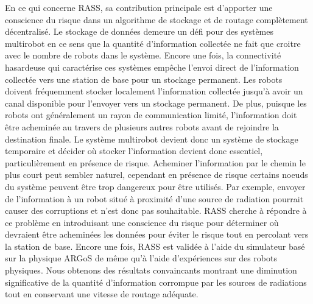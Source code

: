 En ce qui concerne RASS, sa contribution principale est d'apporter une conscience du risque dans un algorithme de stockage et de routage complètement décentralisé. Le stockage de données demeure un défi pour des systèmes multirobot en ce sens que la quantité d'information collectée ne fait que croitre avec le nombre de robots dans le système. Encore une fois, la connectivité hasardeuse qui caractérise ces systèmes \cite{amigoni2017multirobot} empêche l'envoi direct de l'information collectée vers une station de base pour un stockage permanent. Les robots doivent fréquemment stocker localement l'information collectée jusqu'à avoir un canal disponible pour l'envoyer vers un stockage permanent. De plus, puisque les robots ont généralement un rayon de communication limité, l'information doit être acheminée au travers de plusieurs autres robots avant de rejoindre la destination finale. Le système multirobot devient donc un système de stockage temporaire et décider où stocker l'information devient donc essentiel, particulièrement en présence de risque. Acheminer l'information par le chemin le plus court peut sembler naturel, cependant en présence de risque certains noeuds du système peuvent être trop dangereux pour être utilisés. Par exemple, envoyer de l'information à un robot situé à proximité d'une source de radiation pourrait causer des corruptions et n'est donc pas souhaitable. RASS cherche à répondre à ce problème en introduisant une conscience du risque pour déterminer où devraient être acheminées les données pour éviter le risque tout en percolant vers la station de base. Encore une fois, RASS est validée à l'aide du simulateur basé sur la physique ARGoS \cite{Pinciroli:SI2012} de même qu'à l'aide d'expériences sur des robots physiques. Nous obtenons des résultats convaincants montrant une diminution significative de la quantité d'information corrompue par les sources de radiations tout en conservant une vitesse de routage adéquate.

